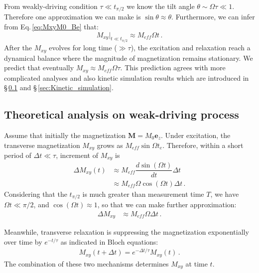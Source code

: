 From weakly-driving condition $\tau \ll t_{\pi/2}$ we know the tilt angle $\theta \sim \Omega  \tau \ll 1$. Therefore one approximation we can make is $\sin \theta \approx \theta$. 
Furthermore, we can infer from Eq.\,\eqref{eq:MxyM0_Be} that:
\begin{equation}
    M_{xy}|_{t \ll t_{\pi/2}} \approx M_{eff} \Omega  t\,. 
\end{equation}
After the $M_{xy}$ evolves for long time ($\gg \tau$), the excitation and relaxation reach a dynamical balance where the magnitude of magnetization remains stationary. We predict that eventually $M_{xy} \approx  M_{eff} \Omega \tau$. This prediction agrees with more complicated analyses and also kinetic simulation results which are introduced in \S\,\ref{sec:weaklydrivenNMR:theo} and \S\,\ref{sec:Kinetic_simulation}. 

\subsection{Theoretical analysis on weak-driving process}\label{sec:weaklydrivenNMR:theo}

Assume that initially the magnetization $\textbf{M} = M_0 \mathbf{e}_z$. 
Under excitation, the transverse magnetization $M_{xy}$ grows as $M_{eff} \sin \Omega t_e$. Therefore, within a short period of $\Delta t \ll \tau$, increment of $M_{xy}$ is 
\begin{align}
    \Delta M_{xy}(t) &\approx M_{eff} \dfrac{d \sin(\Omega t)}{dt} \Delta t\\
    &\approx M_{eff} \Omega \cos(\Omega t) \Delta t\,.
\end{align}
Considering that the $t_{\pi/2}$ is much greater than measurement time $T$, we have $\Omega t \ll \pi/2$, and $\cos(\Omega t) \approx 1$, so that we can make further approximation:
\begin{align}
    \Delta M_{xy} &\approx M_{eff} \Omega \Delta t\,. \label{eq:DeltaMxy_excitation}
\end{align}

Meanwhile, transverse relaxation is suppressing the magnetization exponentially over time by $e^{-t/\tau}$ as indicated in Bloch equations:
\begin{align}
    M_{xy}(t + \Delta t) = e^{-\Delta t/\tau} M_{xy}(t)\,.\label{eq:DeltaMxy_relaxation}
\end{align}
The combination of these two mechanisms determines $M_{xy}$ at time $t$.

